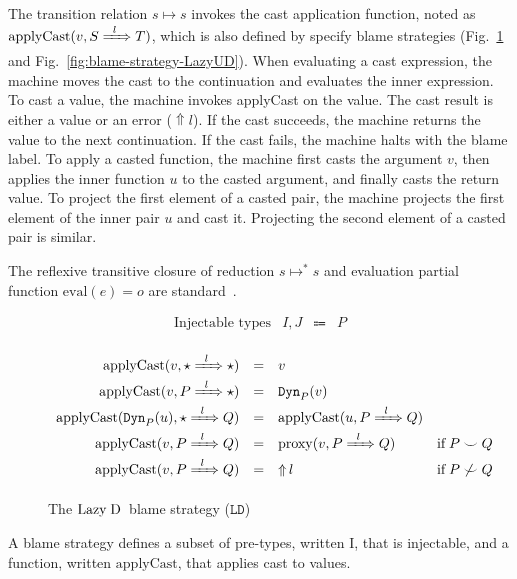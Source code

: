 \documentclass[runningheads]{llncs}
\newcommand{\sidecond}[1]{\text{if}\;#1}
\newcommand{\figequalto}[3]{#1 & = & #2 & #3 \\}
\newcommand{\stxrule}[3]{\text{#2} & #1 & \Coloneqq & #3\\}
\newcommand{\LD}{\ensuremath{\text{Lazy\;D}}}
\newcommand{\just}[1]{\ensuremath{#1}}
\newcommand{\error}[1]{\ensuremath{\mathop{\Uparrow}#1}}
\newcommand{\Tdyn}[0]{\ensuremath{\star}}
\newcommand{\ccast}[3]{#1 \xRightarrow[]{\enskip #2 \enskip} #3}
\newcommand{\vdyn}[2]{\mathtt{Dyn}_{#1}(#2)}
\newcommand{\BLD}[0]{\ensuremath{\mathtt{LD}}}
\newcommand{\proxy}[2]{\ensuremath{\mathrm{proxy}(#1,#2)}}
\newcommand{\applyCast}[2]{\ensuremath{\mathrm{applyCast}(#1,#2)}}
\newcommand{\applyCastName}[0]{\ensuremath{\mathrm{applyCast}}}
\newcommand{\shallowlyconsistent}[2]{\ensuremath{#1\smile#2}}
\newcommand{\notshallowlyconsistent}[2]{\ensuremath{#1\not\smile#2}}
\newcommand{\transitivelyreduceto}[2]{\ensuremath{#1 \longmapsto^{*} #2}}
\newcommand{\reduceto}[2]{\ensuremath{#1 \longmapsto #2}}
\newcommand{\evalto}[2]{\ensuremath{\mathrm{eval}(#1)=#2}}
\begin{document}
The transition relation \reduceto{s}{s} invokes the cast application
function, noted as $\applyCast{v}{\ccast{S}{l}{T}}$, which is also defined
by specify blame strategies (Fig.~\ref{fig:blame-strategy-LazyD} and
Fig.~\ref{fig:blame-strategy-LazyUD}).
%
When evaluating a cast expression, the machine moves the cast to the
continuation and evaluates the inner expression.
%
To cast a value, the machine invokes applyCast on the value. The cast
result is either a value or an error (\error{l}). If the cast
succeeds, the machine returns the value to the next continuation.  If
the cast fails, the machine halts with the blame label.
%
To apply a casted function, the machine first casts the argument $v$, then
applies the inner function $u$ to the casted argument, and finally
casts the return value.
%
To project the first element of a casted pair, the machine projects
the first element of the inner pair $u$ and cast it.
%
Projecting the second element of a casted pair is similar.

The reflexive transitive closure of reduction \transitivelyreduceto{s}{s}
and evaluation partial function ${\evalto{e}{o}}$ are standard~\citep{felleisen03:_pllc}.

\begin{figure}[tp]
\[
\begin{array}{lrcl}
\stxrule{I,J}{Injectable types}{P}
\end{array}
\]
	
\fbox{$\applyCastName_{\BLD}(v,\ccast{S}{l}{T}) = r$}
\[
\begin{array}{rclr}
\figequalto{
\applyCast{v}{\ccast{\Tdyn}{l}{\Tdyn}}
}{
	\just{v}
}{}
\figequalto{
\applyCast{v}{\ccast{P}{l}{\Tdyn}}
}{
	\just{\vdyn{P}{v}}
}{}
\figequalto{
\applyCast{\vdyn{P}{u}}{\ccast{\Tdyn}{l}{Q}}
}{
\applyCast{u}{\ccast{P}{l}{Q}}
}{}
\figequalto{
\applyCast{v}{\ccast{P}{l}{Q}}
}{
	\just{\proxy{v}{\ccast{P}{l}{Q}}}
}{\sidecond{\shallowlyconsistent{P}{Q}}}
\figequalto{
\applyCast{v}{\ccast{P}{l}{Q}}
}{
	\error{l}
}{\sidecond{\notshallowlyconsistent{P}{Q}}}
\end{array}
\]
\caption{The \LD\ blame strategy (\BLD)}
\label{fig:blame-strategy-LazyD}
\end{figure}

\begin{definition}
A blame strategy defines a subset of pre-types, written I, that is injectable,
and a function, written \applyCastName, that applies cast to values.
\end{definition}
\end{document}
